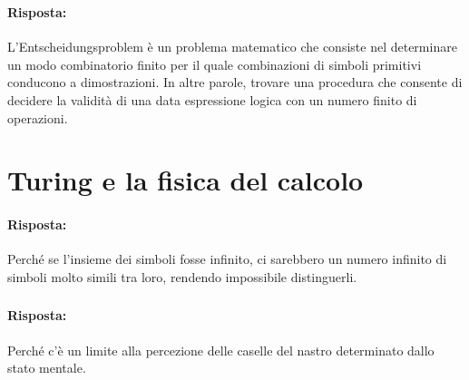 \subsubsection{}


\paragraph{Risposta:} L'Entscheidungsproblem è un problema matematico che consiste nel determinare
un modo combinatorio finito per il quale combinazioni di simboli primitivi conducono a dimostrazioni.
In altre parole, trovare una procedura che consente di decidere la validità di una data
espressione logica con un numero finito di operazioni.

\section{Turing e la fisica del calcolo}


\paragraph{Risposta:} Perché se l'insieme dei simboli fosse infinito, ci sarebbero un numero infinito di 
simboli molto simili tra loro, rendendo impossibile distinguerli.

\subsubsection{}


\paragraph{Risposta:} Perché c'è un limite alla percezione delle caselle del nastro determinato dallo stato mentale.

\subsubsection{}

